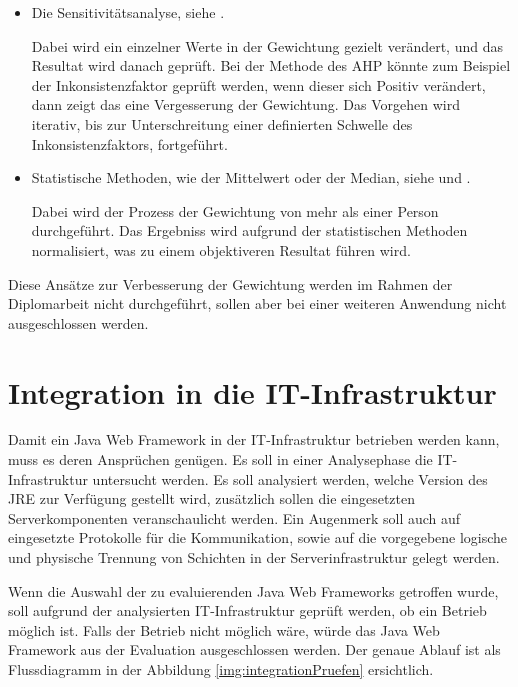   \begin{itemize}
    \item Die Sensitivitätsanalyse, siehe \cite{Sensitivitaetsanalyse}.
    
    Dabei wird ein einzelner Werte in der Gewichtung gezielt verändert, und das
    Resultat wird danach geprüft. Bei der Methode des \ac{AHP} könnte zum
    Beispiel der Inkonsistenzfaktor geprüft werden, wenn dieser sich Positiv
    verändert, dann zeigt das eine Vergesserung der Gewichtung. Das Vorgehen
    wird iterativ, bis zur Unterschreitung einer definierten Schwelle des
    Inkonsistenzfaktors, fortgeführt.
    
    \item Statistische Methoden, wie der Mittelwert oder der Median, siehe
    \cite{Median} und \cite{Mittelwert}.
    
    Dabei wird der Prozess der Gewichtung von mehr als einer Person
    durchgeführt. Das Ergebniss wird aufgrund der statistischen Methoden
    normalisiert, was zu einem objektiveren Resultat führen wird.
  \end{itemize}
  
  Diese Ansätze zur Verbesserung der Gewichtung werden im Rahmen der
  Diplomarbeit nicht durchgeführt, sollen aber bei einer weiteren Anwendung
  nicht ausgeschlossen werden.
  
  \section{Integration in die IT-Infrastruktur}
  
  Damit ein Java Web Framework in der IT-Infrastruktur betrieben werden kann,
  muss es deren Ansprüchen genügen. Es soll in einer Analysephase die
  IT-Infrastruktur untersucht werden. Es soll analysiert werden, welche Version
  des \ac{JRE} zur Verfügung gestellt wird, zusätzlich sollen die eingesetzten
  Serverkomponenten veranschaulicht werden. Ein Augenmerk soll auch auf
  eingesetzte Protokolle für die Kommunikation, sowie auf die vorgegebene
  logische und physische Trennung von Schichten in der Serverinfrastruktur
  gelegt werden.
  
  Wenn die Auswahl der zu evaluierenden Java Web Frameworks getroffen wurde,
  soll aufgrund der analysierten IT-Infrastruktur geprüft werden, ob ein Betrieb
  möglich ist. Falls der Betrieb nicht möglich wäre, würde das Java Web
  Framework aus der Evaluation ausgeschlossen werden. Der genaue Ablauf ist als
  Flussdiagramm in der Abbildung \ref{img:integrationPruefen} ersichtlich.
  
